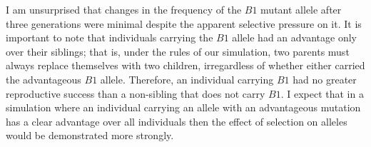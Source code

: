 \documentclass{article}
\begin{document}
        I am unsurprised that changes in the frequency of the $B1$ mutant
            allele after three generations were minimal despite the apparent
            selective pressure on it.
        It is important to note that individuals carrying the $B1$ allele had
            an advantage only over their siblings; that is, under the rules of
            our simulation, two parents must always replace themselves with two
            children, irregardless of whether either carried the advantageous
            $B1$ allele.
        Therefore, an individual carrying $B1$ had no greater reproductive
            success than a non-sibling that does not carry $B1$.
        I expect that in a simulation where an individual carrying an allele
            with an advantageous mutation has a clear advantage over all
            individuals then the effect of selection on alleles would be
            demonstrated more strongly.

    \printbibliography
\end{document}
